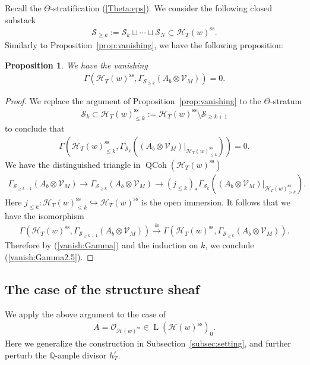 \documentclass[11pt,oneside,a4paper,mathscr]{amsart}
\newtheorem{prop}[thm]{Proposition}
\theoremstyle{definition}
\renewcommand{\leq}{\leqslant}
\renewcommand{\geq}{\geqslant}
\newcommand{\cS}{\mathcal{S}}
\newcommand{\LL}{\operatorname{L}}
\newcommand{\QCoh}{\operatorname{QCoh}}
\newcommand{\cH}{\mathcal{H}}
\begin{document}
Recall the $\Theta$-stratification (\ref{Theta:eps}). 
We consider the following closed substack 
\begin{align*}
    \cS_{\geq k}:=\cS_k \sqcup \cdots \sqcup \cS_N \subset \cH_T(w)^{\mathrm{ss}}.
\end{align*}
Similarly to Proposition~\ref{prop:vanishing}, we have the following 
proposition: 
\begin{prop}\label{prop:vanish2}
We have the vanishing 
    \begin{align}\label{vanish:Gamma2.5}
\Gamma(\cH_T(w)^{\mathrm{ss}}, 
     \Gamma_{\cS_{\geq k}}(A_b\otimes \mathcal{V}_M))=0.
\end{align}
\end{prop}
\begin{proof}
We replace the argument of Proposition~\ref{prop:vanishing} to 
the $\Theta$-stratum 
\begin{align*}
    \cS_k \subset \cH_T(w)^{\mathrm{ss}}_{\leq k}:=\cH_T(w)^{\mathrm{ss}}\setminus \cS_{\geq k+1}
\end{align*}
to conclude that 
\begin{align}\label{vanish:Gamma2}
  \Gamma(\cH_T(w)^{\mathrm{ss}}_{\leq k}, \Gamma_{\cS_k}((A_b \otimes \mathcal{V}_M)|_{\cH_T(w)_{\leq k}^{\mathrm{ss}}}))=0. 
\end{align}
We have the distinguished triangle in $\QCoh(\cH_T(w)^{\mathrm{ss}})$
\begin{align*}
    \Gamma_{\cS_{\geq k+1}}(A_b\otimes \mathcal{V}_M) \to  \Gamma_{\cS_{\geq k}}(A_b\otimes \mathcal{V}_M)
    \to (j_{\leq k})_{*}\Gamma_{\cS_k}((A_b \otimes \mathcal{V}_M)|_{\cH_T(w)^{\mathrm{ss}}_{>k}}).
\end{align*}
Here $j_{\leq k} \colon \cH_T(w)^{\mathrm{ss}}_{\leq k} \hookrightarrow \cH_T(w)^{\mathrm{ss}}$ is the open immersion. It follows that 
we have the isomorphism 
\begin{align*}
    \Gamma(\cH_T(w)^{\mathrm{ss}},  \Gamma_{\cS_{\geq k+1}}(A_b\otimes \mathcal{V}_M)) \stackrel{\cong}{\to} 
    \Gamma(\cH_T(w)^{\mathrm{ss}}, \Gamma_{\cS_{\geq k}}(A_b\otimes \mathcal{V}_M)).
\end{align*}
Therefore by (\ref{vanish:Gamma}) and the induction on $k$, we conclude (\ref{vanish:Gamma2.5}). 
\end{proof}

\subsection{The case of the structure sheaf}\label{subsec:stO}
We apply the above argument to the case of 
\begin{align*}
    A=\mathcal{O}_{\cH(w)^{\mathrm{ss}}} \in \LL(\cH(w)^{\mathrm{ss}})_0.
\end{align*}
Here we generalize the construction in Subsection~\ref{subsec:setting}, and further perturb the 
$\mathbb{Q}$-ample divisor $h_T^{\varepsilon}$. 
\end{document}
